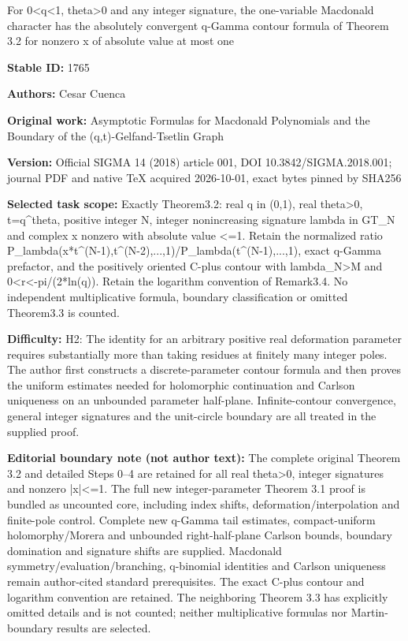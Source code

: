 \documentclass[11pt]{article}
\numberwithin{equation}{section}
\begin{document}
\begin{center}\Large For 0<q<1, theta>0 and any integer signature, the one-variable Macdonald character has the absolutely convergent q-Gamma contour formula of Theorem 3.2 for nonzero x of absolute value at most one\end{center}
\noindent\textbf{Stable ID:} 1765\par
\noindent\textbf{Authors:} Cesar Cuenca\par
\noindent\textbf{Original work:} Asymptotic Formulas for Macdonald Polynomials and the Boundary of the (q,t)-Gelfand-Tsetlin Graph\par
\noindent\textbf{Version:} Official SIGMA 14 (2018) article 001, DOI 10.3842/SIGMA.2018.001; journal PDF and native TeX acquired 2026-10-01, exact bytes pinned by SHA256\par
\noindent\textbf{Selected task scope:} Exactly Theorem3.2: real q in (0,1), real theta>0, t=q\textasciicircum{}theta, positive integer N, integer nonincreasing signature lambda in GT\_N and complex x nonzero with absolute value <=1. Retain the normalized ratio P\_lambda(x*t\textasciicircum{}(N-1),t\textasciicircum{}(N-2),...,1)/P\_lambda(t\textasciicircum{}(N-1),...,1), exact q-Gamma prefactor, and the positively oriented C-plus contour with lambda\_N>M and 0<r<-pi/(2*ln(q)). Retain the logarithm convention of Remark3.4. No independent multiplicative formula, boundary classification or omitted Theorem3.3 is counted.\par
\noindent\textbf{Difficulty:} H2: The identity for an arbitrary positive real deformation parameter requires substantially more than taking residues at finitely many integer poles. The author first constructs a discrete-parameter contour formula and then proves the uniform estimates needed for holomorphic continuation and Carlson uniqueness on an unbounded parameter half-plane. Infinite-contour convergence, general integer signatures and the unit-circle boundary are all treated in the supplied proof.\par
\noindent\textbf{Editorial boundary note (not author text):} The complete original Theorem 3.2 and detailed Steps 0–4 are retained for all real theta>0, integer signatures and nonzero |x|<=1. The full new integer-parameter Theorem 3.1 proof is bundled as uncounted core, including index shifts, deformation/interpolation and finite-pole control. Complete new q-Gamma tail estimates, compact-uniform holomorphy/Morera and unbounded right-half-plane Carlson bounds, boundary domination and signature shifts are supplied. Macdonald symmetry/evaluation/branching, q-binomial identities and Carlson uniqueness remain author-cited standard prerequisites. The exact C-plus contour and logarithm convention are retained. The neighboring Theorem 3.3 has explicitly omitted details and is not counted; neither multiplicative formulas nor Martin-boundary results are selected.\par
\end{document}
